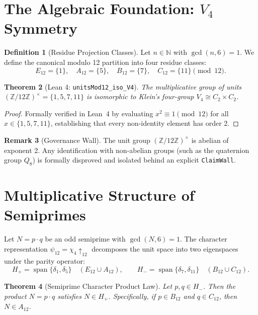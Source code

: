\documentclass[11pt,a4paper]{article}
\newtheorem{theorem}{Theorem}[section]
\theoremstyle{definition}
\newtheorem{definition}[theorem]{Definition}
\newtheorem{remark}[theorem]{Remark}
\begin{document}
	\section{The Algebraic Foundation: $V_4$ Symmetry}
	
	\begin{definition}[Residue Projection Classes]
		Let $n \in \mathbb{N}$ with $\gcd(n, 6) = 1$. We define the canonical modulo 12 partition into four residue classes:
		\[
		E_{12} = \{1\}, \quad A_{12} = \{5\}, \quad B_{12} = \{7\}, \quad C_{12} = \{11\} \pmod{12}.
		\]
	\end{definition}
	
	\begin{theorem}[Lean 4: \texttt{unitsMod12\_iso\_V4}]
		The multiplicative group of units $(\mathbb{Z}/12\mathbb{Z})^\times = \{1, 5, 7, 11\}$ is isomorphic to Klein's four-group $V_4 \cong C_2 \times C_2$.
	\end{theorem}
	\begin{proof}
		Formally verified in Lean~4 by evaluating $x^2 \equiv 1 \pmod{12}$ for all $x \in \{1, 5, 7, 11\}$, establishing that every non-identity element has order 2.
	\end{proof}
	
	\begin{remark}[Governance Wall]
		The unit group $(\mathbb{Z}/12\mathbb{Z})^\times$ is abelian of exponent 2. Any identification with non-abelian groups (such as the quaternion group $Q_8$) is formally disproved and isolated behind an explicit \texttt{ClaimWall}.
	\end{remark}
	
	\section{Multiplicative Structure of Semiprimes}
	
	Let $N = p \cdot q$ be an odd semiprime with $\gcd(N, 6) = 1$. The character representation $\psi_{12} = \chi_4 \uparrow_{12}$ decomposes the unit space into two eigenspaces under the parity operator:
	\[
	H_+ = \operatorname{span}\{\delta_1, \delta_5\} \quad (E_{12} \cup A_{12}), \qquad H_- = \operatorname{span}\{\delta_7, \delta_{11}\} \quad (B_{12} \cup C_{12}).
	\]
	
	\begin{theorem}[Semiprime Character Product Law]
		Let $p, q \in H_-$. Then the product $N = p \cdot q$ satisfies $N \in H_+$. Specifically, if $p \in B_{12}$ and $q \in C_{12}$, then $N \in A_{12}$.
	\end{theorem}
	
\end{document}
